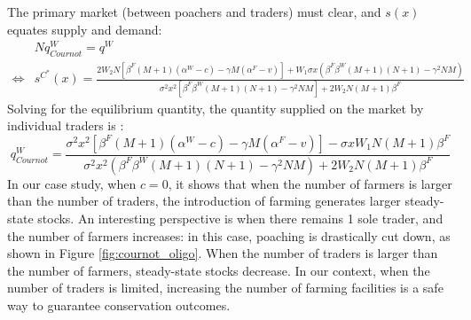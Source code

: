 %
The primary market (between poachers and traders) must clear, and $s(x)$ equates supply and demand: 
\begin{align}
    &Nq^W_{Cournot} = q^W \\
    \iff & s^{C^*}(x) = \frac{2W_2N\left[\beta^F (M+1) (\alpha^W-c) - \gamma M (\alpha^F - v)\right] + W_1 \sigma x (\beta^F \beta^W (M+1)(N+1) - \gamma^2 NM)}{\sigma^2 x^2 [\beta^F \beta^W (M+1) (N+1) - \gamma^2 NM] + 2W_2N(M+1)\beta^F}
\end{align}
%
Solving for the equilibrium quantity, the quantity supplied on the market by individual traders is : 
%
\begin{equation}
    q^W_{Cournot} = \frac{\sigma^2 x^2 \left[ \beta^F(M+1) (\alpha^W - c) - \gamma M(\alpha^F -v) \right] - \sigma x W_1 N(M+1) \beta^F}{\sigma^2 x^2 (\beta^F \beta^W (M+1)(N+1)-\gamma^2 NM) + 2W_2N(M+1)\beta^F}
\end{equation}
In our case study, when $c=0$, it 
shows that when the number of farmers is larger than the number of traders, the introduction of farming generates larger steady-state stocks. An interesting perspective is when there remains 1 sole trader, and the number of farmers increases: in this case, poaching is drastically cut down, as shown in Figure \ref{fig:cournot_oligo}.
%
When the number of traders is larger than the number of farmers, steady-state stocks decrease. In our context, when the number of traders is limited, increasing the number of farming facilities is a safe way to guarantee conservation outcomes. 

